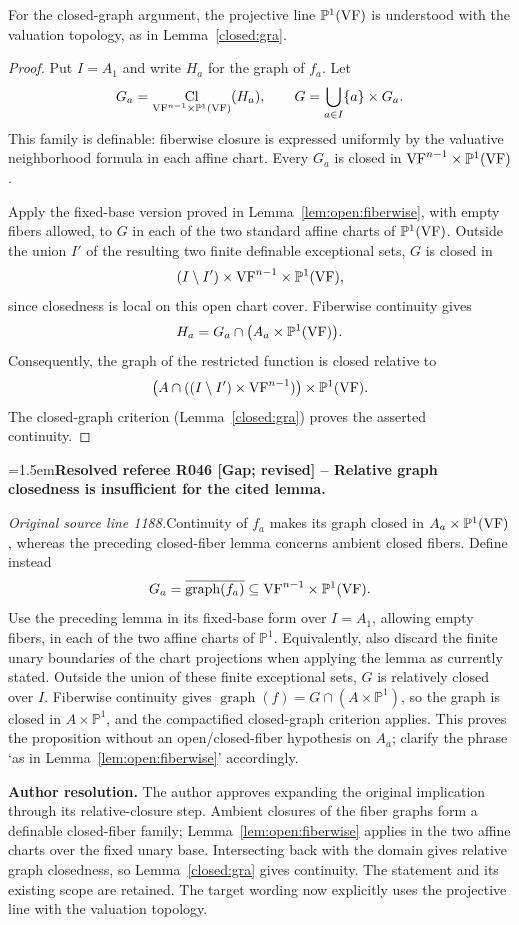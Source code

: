 \documentclass[12pt]{amsart}
\newcommand{\ResolvedRefereeRemark}[5]{%
  \par\medskip\begingroup\normalfont\small\color{gray}%
  \emergencystretch=1.5em\noindent\textbf{Resolved referee R#1 [#2] -- #3.}\par\nobreak\noindent #4\par
  \medskip\color{ResolutionGreen}\noindent\textbf{Author resolution.} #5\par
  \endgroup\medskip
}
\theoremstyle{plain}
\theoremstyle{definition}
\theoremstyle{remark}
\numberwithin{equation}{section}
\theoremstyle{plain}
\newcommand{\VF}{\textup{VF}}
\newcommand{\0}{\emptyset}
\DeclareMathOperator{\Cl}{Cl}
\begin{document}
For the closed-graph argument, the projective line $\mathbb P^1(\VF)$ is understood with the valuation topology, as in Lemma~\ref{closed:gra}.

\begin{proof}
Put $I=A_1$ and write $H_a$ for the graph of $f_a$. Let
\[
G_a=\Cl_{\VF^{n-1}\times\mathbb P^1(\VF)}(H_a),\qquad
G=\bigcup_{a\in I}\{a\}\times G_a.
\]
This family is definable: fiberwise closure is expressed uniformly by the valuative neighborhood formula in each affine chart. Every $G_a$ is closed in $\VF^{n-1}\times\mathbb P^1(\VF)$.

Apply the fixed-base version proved in Lemma~\ref{lem:open:fiberwise}, with empty fibers allowed, to $G$ in each of the two standard affine charts of $\mathbb P^1(\VF)$. Outside the union $I'$ of the resulting two finite definable exceptional sets, $G$ is closed in
\[
(I\setminus I')\times\VF^{n-1}\times\mathbb P^1(\VF),
\]
since closedness is local on this open chart cover. Fiberwise continuity gives
\[
H_a=G_a\cap\bigl(A_a\times\mathbb P^1(\VF)\bigr).
\]
Consequently, the graph of the restricted function is closed relative to
\[
\bigl(A\cap((I\setminus I')\times\VF^{n-1})\bigr)\times\mathbb P^1(\VF).
\]
The closed-graph criterion (Lemma~\ref{closed:gra}) proves the asserted continuity.
\end{proof}

\ResolvedRefereeRemark{046}{Gap; revised}{Relative graph closedness is insufficient for the cited lemma}{%
\textit{Original source line 1188.}\quad Continuity of $f_a$ makes its graph closed in $A_a\times\mathbb P^1(\VF)$, whereas the preceding closed-fiber lemma concerns ambient closed fibers. Define instead
\[
 G_a=\overline{\operatorname{graph}(f_a)}\subseteq\VF^{n-1}\times\mathbb P^1(\VF).
\]
Use the preceding lemma in its fixed-base form over $I=A_1$, allowing empty fibers, in each of the two affine charts of $\mathbb P^1$. Equivalently, also discard the finite unary boundaries of the chart projections when applying the lemma as currently stated. Outside the union of these finite exceptional sets, $G$ is relatively closed over $I$. Fiberwise continuity gives $\operatorname{graph}(f)=G\cap(A\times\mathbb P^1)$, so the graph is closed in $A\times\mathbb P^1$, and the compactified closed-graph criterion applies. This proves the proposition without an open/closed-fiber hypothesis on $A_a$; clarify the phrase `as in Lemma~\ref{lem:open:fiberwise}' accordingly.
}{The author approves expanding the original implication through its relative-closure step. Ambient closures of the fiber graphs form a definable closed-fiber family; Lemma~\ref{lem:open:fiberwise} applies in the two affine charts over the fixed unary base. Intersecting back with the domain gives relative graph closedness, so Lemma~\ref{closed:gra} gives continuity. The statement and its existing scope are retained. The target wording now explicitly uses the projective line with the valuation topology.}
\end{document}
